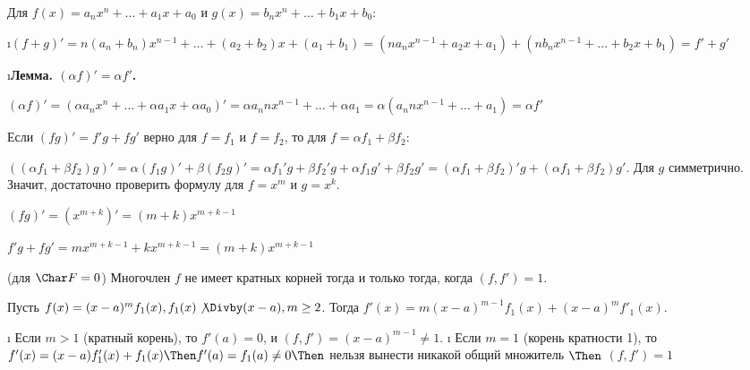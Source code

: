 \begin{solution}
Для \(f(x) = a_nx^n+\dots+a_1x+a_0\) и \(g(x) = b_nx^n+\dots+b_1x+b_0\):

\begin{itemize}
\i \((f+g)'= n(a_n+b_n)x^{n-1}+\dots+(a_2+b_2)x+(a_1+b_1) = (na_nx^{n-1}+a_2x+a_1)+(nb_nx^{n-1}+\dots+b_2x+b_1) = f'+g'\)

\i \bf{Лемма.} $(\alpha f)' = \alpha f'$.
	\begin{solution}
		$(\alpha f)' = (\alpha a_nx^n+\dots+\alpha a_1 x + \alpha a_0)' = \alpha a_n n x^{n-1}+\dots+\alpha a_1 = \alpha(a_n n x^{n-1}+\dots+ a_1) = \alpha f'$
	\end{solution}
	
	Если $(fg)' = f'g+fg'$ верно для $f=f_1$ и $f=f_2$, то для $f=\alpha f_1 + \beta f_2$:

	$((\alpha f_1 + \beta f_2)g)' = \alpha(f_1g)'+\beta(f_2g)' = \alpha f_1'g+\beta f_2'g+\alpha f_1g'+\beta f_2g' = (\alpha f_1 + \beta f_2)'g+(\alpha f_1 + \beta f_2)g'$. Для $g$ симметрично. Значит, достаточно проверить формулу для $f = x^m$ и $g = x^k$.
	
	$(fg)' = (x^{m+k})' = (m+k)x^{m+k-1}$
	
	$f'g+fg' = mx^{m+k-1}+kx^{m+k-1} = (m+k)x^{m+k-1}$
	
\end{itemize}
\end{solution}

\begin{problem}[37 (9.2)]
(для $\Char F = 0$) Многочлен $f$ не имеет кратных корней тогда и только тогда, когда $(f,f')=1$.
\end{problem}

\begin{solution}
Пусть \(f(x) = (x-a)^mf_1(x), f_1(x) \not\Divby (x-a), m \ge 2\). Тогда \(f'(x)=m(x-a)^{m-1}f_1(x)+(x-a)^mf'_1(x)\).

\begin{itemize}
\tightlist
\i
  Если \(m>1\) (кратный корень), то \(f'(a) = 0\), и $(f, f') = (x-a)^{m-1} \ne 1$.
\i
  Если \(m=1\) (корень кратности 1), то \(f'(x)=(x-a)f'_1(x)+f_1(x) \Then f'(a)=f_1(a) \ne 0 \Then \) нельзя вынести никакой общий множитель $\Then$ $(f,f')=1$ 
\end{itemize}


\end{solution}

